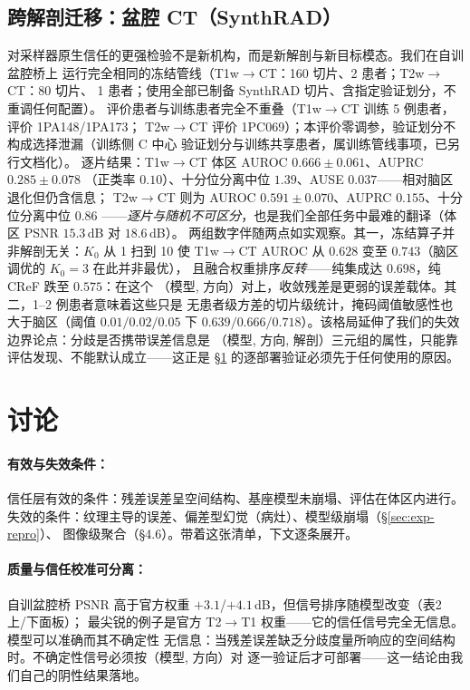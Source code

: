 \documentclass[11pt]{article}
\begin{document}
\subsection{跨解剖迁移：盆腔 CT（SynthRAD）}
\label{sec:exp-synthrad}
对采样器原生信任的更强检验不是新机构，而是新解剖与新目标模态。我们在自训盆腔桥上
运行完全相同的冻结管线（T1w$\to$CT：160 切片、2 患者；T2w$\to$CT：80 切片、
1 患者；使用全部已制备 SynthRAD 切片、含指定验证划分，不重调任何配置）。
评价患者与训练患者完全不重叠（T1w$\to$CT 训练 5 例患者，评价 1PA148/1PA173；
T2w$\to$CT 评价 1PC069）；本评价零调参，验证划分不构成选择泄漏（训练侧 C 中心
验证划分与训练共享患者，属训练管线事项，已另行文档化）。
逐片结果：T1w$\to$CT 体区 AUROC $0.666\pm0.061$、AUPRC $0.285\pm0.078$
（正类率 $0.10$）、十分位分离中位 $1.39$、AUSE $0.037$——相对脑区退化但仍含信息；
T2w$\to$CT 则为 AUROC $0.591\pm0.070$、AUPRC $0.155$、十分位分离中位 $0.86$
——\emph{逐片与随机不可区分}，也是我们全部任务中最难的翻译（体区 PSNR $15.3$\,dB
对 $18.6$\,dB）。
两组数字伴随两点如实观察。其一，冻结算子并非解剖无关：$K_0$ 从 1 扫到 10 使
T1w$\to$CT AUROC 从 $0.628$ 变至 $0.743$（脑区调优的 $K_0{=}3$ 在此并非最优），
且融合权重排序\emph{反转}——纯集成达 $0.698$，纯 CReF 跌至 $0.575$：在这个
（模型, 方向）对上，收敛残差是更弱的误差载体。其二，1--2 例患者意味着这些只是
无患者级方差的切片级统计，掩码阈值敏感性也大于脑区（阈值 $0.01/0.02/0.05$ 下
$0.639/0.666/0.718$）。该格局延伸了我们的失效边界论点：分歧是否携带误差信息是
（模型, 方向, 解剖）三元组的属性，只能靠评估发现、不能默认成立——这正是
\S\ref{sec:discussion} 的逐部署验证必须先于任何使用的原因。

\section{讨论}
\label{sec:discussion}
\paragraph{有效与失效条件：}
信任层有效的条件：残差误差呈空间结构、基座模型未崩塌、评估在体区内进行。
失效的条件：纹理主导的误差、偏差型幻觉（病灶）、模型级崩塌（\S\ref{sec:exp-repro}）、
图像级聚合（\S4.6）。带着这张清单，下文逐条展开。
\paragraph{质量与信任校准可分离：}
自训盆腔桥 PSNR 高于官方权重 $+3.1$/$+4.1$\,dB，但信号排序随模型改变（表2 上/下面板）；
最尖锐的例子是官方 T2$\to$T1 权重——它的信任信号完全无信息。模型可以准确而其不确定性
无信息：当残差误差缺乏分歧度量所响应的空间结构时。不确定性信号必须按（模型, 方向）对
逐一验证后才可部署——这一结论由我们自己的阴性结果落地。
\end{document}
